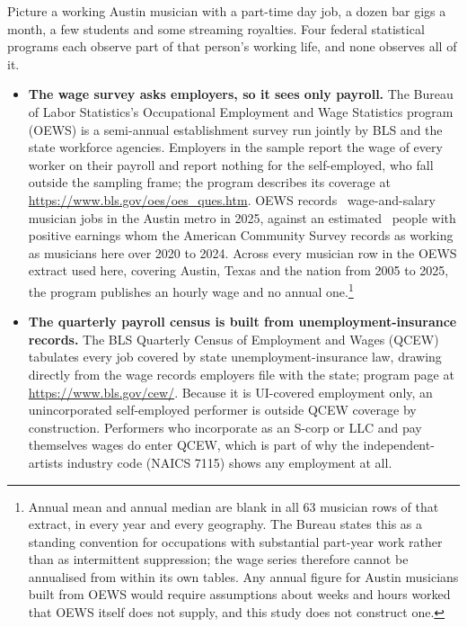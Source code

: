 \begin{sidebar}[title=What the federal statistics can and cannot see]
{\footnotesize
Picture a working Austin musician with a part-time day job, a dozen bar gigs a
month, a few students and some streaming royalties. Four federal statistical
programs each observe part of that person's working life, and none observes
all of it.

\begin{itemize}
\item \textbf{The wage survey asks employers, so it sees only payroll.} The
Bureau of Labor Statistics's Occupational Employment and Wage Statistics
program (OEWS) is a semi-annual establishment survey run jointly by BLS and
the state workforce agencies. Employers in the sample report the wage of every
worker on their payroll and report nothing for the self-employed, who fall
outside the sampling frame; the program describes its coverage at
\url{https://www.bls.gov/oes/oes_ques.htm}. OEWS records
\NEmpPayrollMusiciansAustinLast\ wage-and-salary musician jobs in the Austin
metro in 2025, against an estimated \NPumsAustinMusWtdPos\ people with positive
earnings whom the American Community Survey records as working as musicians
here over 2020 to 2024. Across every musician row in the OEWS extract used
here, covering Austin, Texas and the nation from 2005 to 2025, the program
publishes an hourly wage and no annual one.\footnote{Annual mean and annual
median are blank in all 63 musician rows of that extract, in every year and
every geography. The Bureau states this as a standing convention for
occupations with substantial part-year work rather than as intermittent
suppression; the wage series therefore cannot be annualised from within its
own tables. Any annual figure for Austin musicians built from OEWS would
require assumptions about weeks and hours worked that OEWS itself does not
supply, and this study does not construct one.}

\item \textbf{The quarterly payroll census is built from unemployment-insurance
records.} The BLS Quarterly Census of Employment and Wages (QCEW) tabulates
every job covered by state unemployment-insurance law, drawing directly from
the wage records employers file with the state; program page at
\url{https://www.bls.gov/cew/}. Because it is UI-covered employment only, an
unincorporated self-employed performer is outside QCEW coverage by
construction. Performers who incorporate as an S-corp or LLC and pay themselves
wages do enter QCEW, which is part of why the independent-artists industry code
(NAICS 7115) shows any employment at all.


\end{itemize}}
\end{sidebar}
